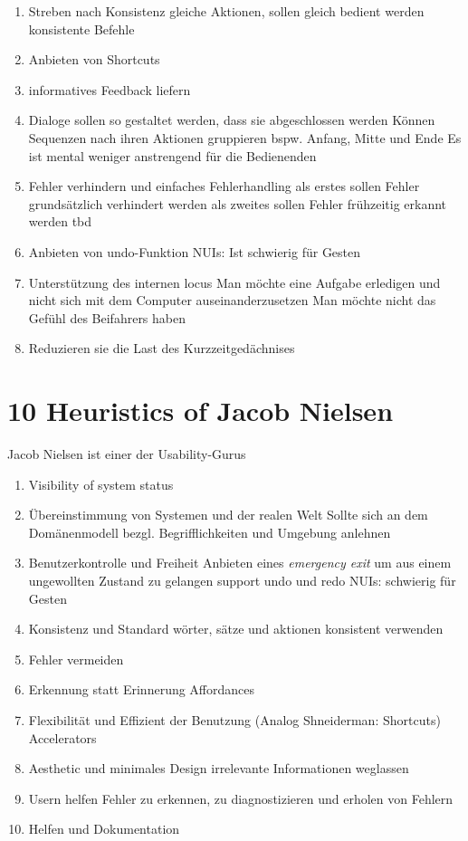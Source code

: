 \documentclass{report}
\theoremstyle{definition}
\theoremstyle{example}
\begin{document}
\begin{enumerate}
   \item Streben nach Konsistenz
   \subitem gleiche Aktionen, sollen gleich bedient werden
   \subitem konsistente Befehle 
   \item Anbieten von Shortcuts
   \item informatives Feedback liefern
   \item Dialoge sollen so gestaltet werden, dass sie abgeschlossen werden Können
   \subitem Sequenzen nach ihren Aktionen gruppieren bspw. Anfang, Mitte und Ende
   \subitem Es ist mental weniger anstrengend für die Bedienenden
   \item Fehler verhindern und einfaches Fehlerhandling
   \subitem als erstes sollen Fehler grundsätzlich verhindert werden
   \subitem als zweites sollen Fehler frühzeitig erkannt werden
   \subitem tbd
   \item Anbieten von undo-Funktion
   \subitem NUIs: Ist schwierig für Gesten
   \item Unterstützung des internen locus
   \subitem Man möchte eine Aufgabe erledigen und nicht sich mit dem Computer auseinanderzusetzen
   \subitem Man möchte nicht das Gefühl des Beifahrers haben
   \item  Reduzieren sie die Last des Kurzzeitgedächnises
\end{enumerate}

\section{10 Heuristics of Jacob Nielsen}
Jacob Nielsen ist einer der Usability-Gurus

\begin{enumerate}
   \item Visibility of system status
   \item Übereinstimmung von Systemen und der realen Welt
   \subitem Sollte sich an dem Domänenmodell bezgl. Begrifflichkeiten und Umgebung anlehnen 
   \item Benutzerkontrolle und Freiheit
   \subitem Anbieten eines \textit{emergency exit} um aus einem ungewollten Zustand zu gelangen
   \subitem support undo und redo
   \subitem NUIs: schwierig für Gesten 
   \item Konsistenz und Standard
   \subitem wörter, sätze und aktionen konsistent verwenden 
   \item Fehler vermeiden
   \item Erkennung statt Erinnerung
   \subitem Affordances
   \item Flexibilität und Effizient der Benutzung (Analog Shneiderman: Shortcuts)
   \subitem Accelerators 
   \item Aesthetic und minimales Design
   \subitem irrelevante Informationen weglassen
   \item Usern helfen Fehler zu erkennen, zu diagnostizieren und erholen von Fehlern
   \item Helfen und Dokumentation 
\end{enumerate}
\end{document}
